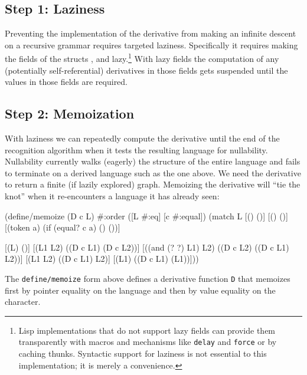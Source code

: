 \subsection{Step 1: Laziness} 
%
Preventing the implementation of the derivative from making an infinite descent
on a recursive grammar requires targeted laziness.
%
Specifically it requires making the fields of the structs {\tt \ttcup},
{\ttcirc} and {\ttstar} lazy.\footnote{%
  Lisp implementations that do not support lazy fields can provide them
  transparently with macros and mechanisms like {\tt delay} and {\tt force} or by caching thunks.
  Syntactic support for laziness is not essential to this implementation; it is
  merely a convenience.
}
%
With lazy fields the computation of any (potentially self-referential)
derivatives in those fields gets suspended until the values in those fields are
required.
%


\subsection{Step 2: Memoization}
%
With laziness we can repeatedly compute the derivative until the end of the
  recognition algorithm when it tests the resulting language for nullability.
%
Nullability currently walks (eagerly) the structure of the entire language and
fails to terminate on a derived language such as the one above.
%
We need the derivative to return a finite (if lazily explored) graph.
%
Memoizing the derivative will ``tie the knot'' when it re-encounters
a language it has already seen:

\begin{code}
(define/memoize (D c L)
  #:order ([L #:eq] [c #:equal])
  (match L
    [(\ttempty)                     (\ttempty)]
    [(\ttepsilon)                     (\ttempty)]
    [(token a)               (if (equal? c a) (\ttepsilon) (\ttempty))]

    [(\ttdelta L)                   (\ttempty)]
    [(\ttcup L1 L2)               (\ttcup (D c L1) (D c L2))]
    [(\ttcirc (and (? \ttdelta?) L1) L2)  (\ttcup (D c L2) (\ttcirc (D c L1) L2))]
    [(\ttcirc L1 L2)               (\ttcirc (D c L1) L2)]
    [(\ttstar L1)                  (\ttcirc (D c L1) (\ttstar L1))]))\end{code}
%
The  \texttt{define/memoize}
form above defines a derivative function \texttt{D} that memoizes first by pointer equality
on the language and then by value equality on the character.


